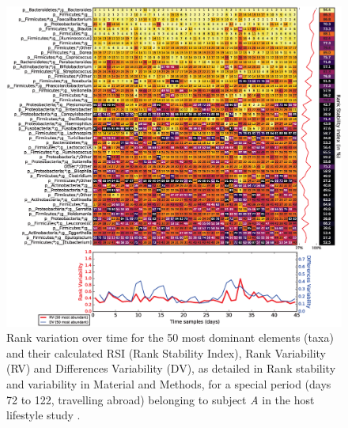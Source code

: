 \begin{figure}
	\centering
	\includegraphics[width=1.0\textwidth]{figs/Fig4.eps}
	\caption{Rank variation over time for the 50 most dominant elements (taxa) and their calculated RSI (Rank Stability Index), Rank Variability (RV) and Differences Variability (DV), as detailed in Rank stability and variability in Material and Methods, for a special period (days 72 to 122, travelling abroad) belonging to subject \emph{A} in the host lifestyle study \cite{hostlife}.}
	\label{fig:corrank_HLS_abroad}
\end{figure}

